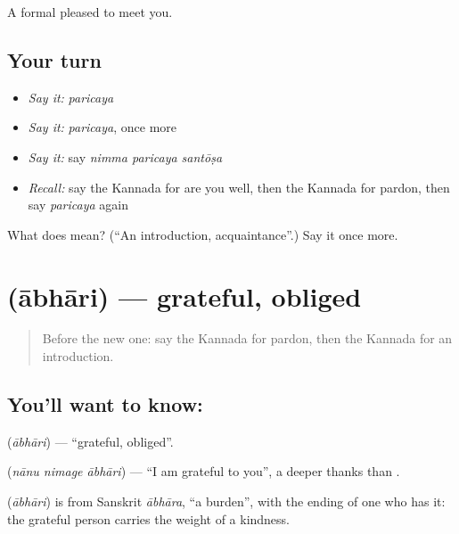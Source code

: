 \begin{grammarlens}[title={What you've built}]
A formal pleased to meet you.
\end{grammarlens}

\subsection*{Your turn}
\begin{itemize}
\raggedright
  \item \emph{Say it:} \emph{paricaya}
  \item \emph{Say it:} \emph{paricaya}, once more
  \item \emph{Say it:} say \emph{nimma paricaya santōṣa}
  \item \emph{Recall:} say the Kannada for are you well, then the Kannada for pardon, then say \emph{paricaya} again
\end{itemize}

\begin{tcolorbox}[breakable,colback=teal!4,colframe=teal!35!black,title={Before you move on}]
What does  mean? (\textquotedblleft{}An introduction, acquaintance\textquotedblright{}.) Say it once more.
\end{tcolorbox}
\section[\texorpdfstring{\kn{ಆಭಾರಿ} (ābhāri)}{ಆಭಾರಿ (ābhāri)}]{ (ābhāri) — grateful, obliged}

\label{lesson:KA-C97-grateful}



\begin{quote}
Before the new one: say the Kannada for pardon, then the Kannada for an introduction.
\end{quote}

\subsection*{You'll want to know: }
\textbf{} (\emph{ābhāri}) — \textquotedblleft{}grateful, obliged\textquotedblright{}.

\textbf{  } (\emph{nānu nimage ābhāri}) — \textquotedblleft{}I am grateful to you\textquotedblright{}, a deeper thanks than \textbf{}.

\begin{cousinweb}
\textbf{} (\emph{ābhāri}) is from Sanskrit \emph{ābhāra}, \textquotedblleft{}a burden\textquotedblright{}, with the ending of one who has it: the grateful person carries the weight of a kindness.
\end{cousinweb}

